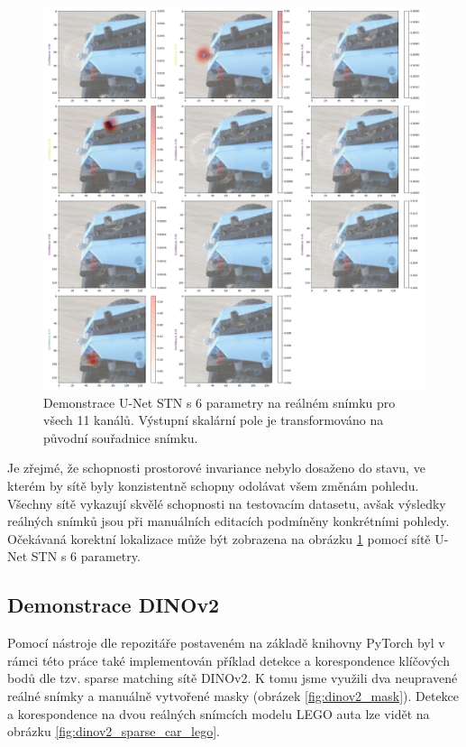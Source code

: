 \begin{figure}[ht]
\centering
\includegraphics[width=1.0\textwidth,keepaspectratio]{Figures/real/real_3.png}
\caption[Demonstrace U-Net STN 6p na reálném snímku]{Demonstrace U-Net STN s 6 parametry na reálném snímku pro všech 11 kanálů. Výstupní skalární pole je transformováno na původní souřadnice snímku.}
\label{fig:real_0}
\end{figure}

Je zřejmé, že schopnosti prostorové invariance nebylo dosaženo do stavu, ve kterém by sítě byly konzistentně schopny odolávat všem změnám pohledu. Všechny sítě vykazují skvělé schopnosti na testovacím datasetu, avšak výsledky reálných snímků jsou při manuálních editacích podmíněny konkrétními pohledy. Očekávaná korektní lokalizace může být zobrazena na obrázku \ref{fig:real_0} pomocí sítě U-Net STN s 6 parametry.

\subsection{Demonstrace DINOv2}

Pomocí nástroje dle repozitáře \cite{jupyter_sparse_matching} postaveném na základě knihovny PyTorch byl v rámci této práce také implementován příklad detekce a korespondence klíčových bodů dle tzv. sparse matching sítě DINOv2. K tomu jsme využili dva neupravené reálné snímky a manuálně vytvořené masky (obrázek \ref{fig:dinov2_mask}). Detekce a korespondence na dvou reálných snímcích modelu LEGO auta lze vidět na obrázku \ref{fig:dinov2_sparse_car_lego}.


